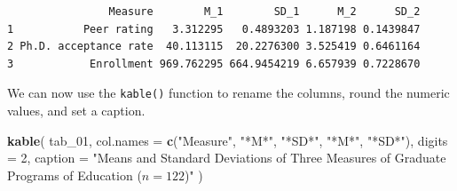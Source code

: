 \documentclass[]{book}
\newenvironment{Shaded}{\begin{snugshade}}{\end{snugshade}}
\newcommand{\DataTypeTok}[1]{\textcolor[rgb]{0.13,0.29,0.53}{#1}}
\newcommand{\DecValTok}[1]{\textcolor[rgb]{0.00,0.00,0.81}{#1}}
\newcommand{\KeywordTok}[1]{\textcolor[rgb]{0.13,0.29,0.53}{\textbf{#1}}}
\newcommand{\NormalTok}[1]{#1}
\newcommand{\OperatorTok}[1]{\textcolor[rgb]{0.81,0.36,0.00}{\textbf{#1}}}
\newcommand{\StringTok}[1]{\textcolor[rgb]{0.31,0.60,0.02}{#1}}
\begin{document}
\begin{Shaded}
\end{Shaded}

\begin{verbatim}
                Measure        M_1        SD_1      M_2      SD_2
1           Peer rating   3.312295   0.4893203 1.187198 0.1439847
2 Ph.D. acceptance rate  40.113115  20.2276300 3.525419 0.6461164
3            Enrollment 969.762295 664.9454219 6.657939 0.7228670
\end{verbatim}

We can now use the \texttt{kable()} function to rename the columns, round the numeric values, and set a caption.

\begin{Shaded}
\begin{Highlighting}[]
\KeywordTok{kable}\NormalTok{(}
\NormalTok{  tab_}\DecValTok{01}\NormalTok{,}
  \DataTypeTok{col.names =} \KeywordTok{c}\NormalTok{(}\StringTok{"Measure"}\NormalTok{, }\StringTok{"*M*"}\NormalTok{, }\StringTok{"*SD*"}\NormalTok{, }\StringTok{"*M*"}\NormalTok{, }\StringTok{"*SD*"}\NormalTok{),}
  \DataTypeTok{digits =} \DecValTok{2}\NormalTok{,}
  \DataTypeTok{caption =} \StringTok{"Means and Standard Deviations of Three Measures of Graduate Programs of Education ($n=122$)"}
\NormalTok{  )}
\end{Highlighting}
\end{Shaded}
\end{document}
